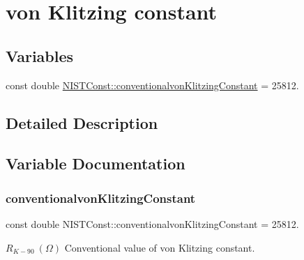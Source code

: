 \hypertarget{group___conventionalvon_klitzing_constant}{}\section{von Klitzing constant}
\label{group___conventionalvon_klitzing_constant}
\subsection*{Variables}
\begin{DoxyCompactItemize}
\item 
const double \hyperlink{group___conventionalvon_klitzing_constant_gabf641ec13f8a8d63762992724dd6d670}{N\+I\+S\+T\+Const\+::conventionalvon\+Klitzing\+Constant} = 25812.
\end{DoxyCompactItemize}


\subsection{Detailed Description}


\subsection{Variable Documentation}
\mbox{\label{group___conventionalvon_klitzing_constant_gabf641ec13f8a8d63762992724dd6d670}} 
\subsubsection{\texorpdfstring{conventionalvon\+Klitzing\+Constant}{conventionalvonKlitzingConstant}}
{\footnotesize\ttfamily const double N\+I\+S\+T\+Const\+::conventionalvon\+Klitzing\+Constant = 25812.}

$R_{K-90} \ (\Omega)$ Conventional value of von Klitzing constant. 